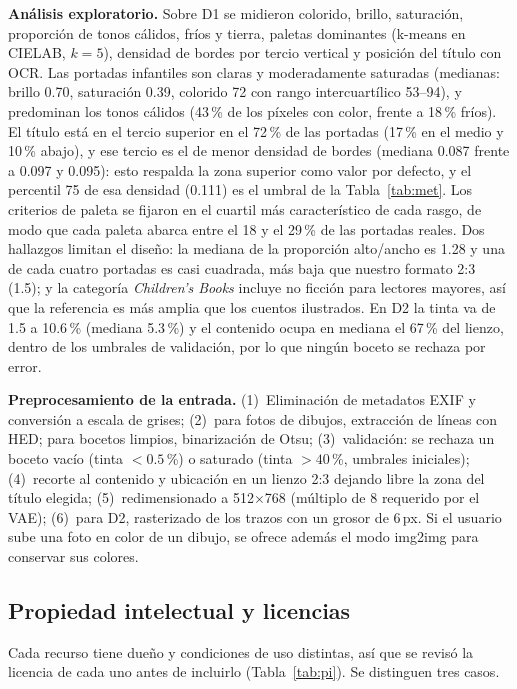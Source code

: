 \documentclass[10pt,a4paper,twocolumn]{article}
\begin{document}
\textbf{Análisis exploratorio.} Sobre D1 se midieron colorido, brillo, saturación, proporción de tonos cálidos, fríos y tierra, paletas dominantes (k-means en CIELAB, $k=5$), densidad de bordes por tercio vertical y posición del título con OCR. Las portadas infantiles son claras y moderadamente saturadas (medianas: brillo 0.70, saturación 0.39, colorido 72 con rango intercuartílico 53--94), y predominan los tonos cálidos (43\,\% de los píxeles con color, frente a 18\,\% fríos). El título está en el tercio superior en el 72\,\% de las portadas (17\,\% en el medio y 10\,\% abajo), y ese tercio es el de menor densidad de bordes (mediana 0.087 frente a 0.097 y 0.095): esto respalda la zona superior como valor por defecto, y el percentil 75 de esa densidad (0.111) es el umbral de la Tabla~\ref{tab:met}. Los criterios de paleta se fijaron en el cuartil más característico de cada rasgo, de modo que cada paleta abarca entre el 18 y el 29\,\% de las portadas reales. Dos hallazgos limitan el diseño: la mediana de la proporción alto/ancho es 1.28 y una de cada cuatro portadas es casi cuadrada, más baja que nuestro formato 2:3 (1.5); y la categoría \emph{Children's Books} incluye no ficción para lectores mayores, así que la referencia es más amplia que los cuentos ilustrados. En D2 la tinta va de 1.5 a 10.6\,\% (mediana 5.3\,\%) y el contenido ocupa en mediana el 67\,\% del lienzo, dentro de los umbrales de validación, por lo que ningún boceto se rechaza por error.

\textbf{Preprocesamiento de la entrada.}
(1)~Eliminación de metadatos EXIF y conversión a escala de grises;
(2)~para fotos de dibujos, extracción de líneas con HED; para bocetos limpios, binarización de Otsu;
(3)~validación: se rechaza un boceto vacío (tinta $<0.5$\,\%) o saturado (tinta $>40$\,\%, umbrales iniciales);
(4)~recorte al contenido y ubicación en un lienzo 2:3 dejando libre la zona del título elegida;
(5)~redimensionado a 512$\times$768 (múltiplo de 8 requerido por el VAE);
(6)~para D2, rasterizado de los trazos con un grosor de 6\,px.
Si el usuario sube una foto en color de un dibujo, se ofrece además el modo img2img para conservar sus colores.

\subsection{Propiedad intelectual y licencias}\label{sec:pi}
Cada recurso tiene dueño y condiciones de uso distintas, así que se revisó la licencia de cada uno antes de incluirlo (Tabla~\ref{tab:pi}). Se distinguen tres casos.
\end{document}
